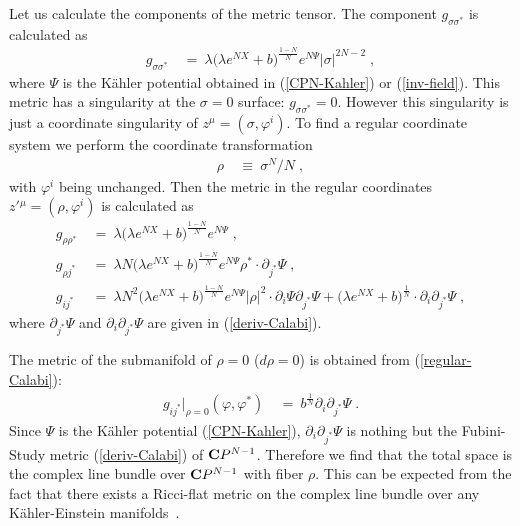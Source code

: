 \documentclass[a4paper,11pt]{article}
\newcommand{\del}{\partial}
\newcommand{\kahler}{K\"{a}hler }
\begin{document}
{Let us calculate the components of the metric tensor. 
The component $g_{\sigma \sigma^*}$ is calculated as
\begin{align}
g_{\sigma \sigma^*} 
\ &= \ 
\lambda \big( \lambda e^{N X} + b \big)^{\frac{1-N}{N}} 
e^{N \Psi} |\sigma|^{2 N - 2} \; ,
\end{align}
where $\Psi$ is the \kahler potential obtained 
in (\ref{CPN-Kahler}) or (\ref{inv-field}).
This metric has a singularity at the $\sigma = 0$ surface: $g_{\sigma
\sigma^*} = 0$.
However this singularity is just a coordinate singularity of $z^{\mu}
= (\sigma, \varphi^i)$.
To find a regular coordinate system we perform the coordinate
transformation 
\begin{align}
\rho \ &\equiv \ \sigma^N / N \; , \label{rho-Calabi}
\end{align}
with $\varphi^i$ being unchanged. 
Then the metric in the regular coordinates $z'{}^{\mu} = (\rho,
\varphi^i)$ is calculated as
\begin{align}
g_{\rho \rho^*} 
\ &= \ 
\lambda \big( \lambda e^{N X} + b \big)^{\frac{1-N}{N}} e^{N \Psi} 
\; , \nonumber \\
g_{\rho j^*} 
\ &= \ 
\lambda N \big( \lambda e^{N X} + b \big)^{\frac{1-N}{N}} 
e^{N \Psi} \rho^* \cdot \del_{j^*} \Psi \; ,
\label{regular-Calabi} \\
g_{i j^*} 
\ &= \ 
\lambda N^2 \big( \lambda e^{N X} + b \big)^{\frac{1-N}{N}} 
e^{N \Psi} |\rho|^2 \cdot \del_i \Psi \del_{j^*} \Psi 
+ \big( \lambda e^{N X} + b \big)^{\frac{1}{N}} 
\cdot \del_i \del_{j^*} \Psi \; , \nonumber 
\end{align}
where $\del_{j^*} \Psi$ and $\del_i \del_{j^*} \Psi$ are given in
(\ref{deriv-Calabi}).

The metric of the submanifold of $\rho = 0$ ($d \rho = 0$) 
is obtained from (\ref{regular-Calabi}): 
\begin{align}
g_{i j^*} \big|_{\rho = 0} (\varphi, \varphi^*) 
\ &= \
b^{\frac{1}{N}} \del_i \del_{j^*} \Psi \; . \label{sub-mfd-Calabi}
\end{align}
Since $\Psi$ is the \kahler potential (\ref{CPN-Kahler}), 
$\del_i \del_{j^*} \Psi$ is nothing but 
the Fubini-Study metric (\ref{deriv-Calabi}) 
of ${\bf C}P^{N-1}$. 
Therefore we find that 
the total space is the complex line bundle 
over ${\bf C}P^{N-1}$ with fiber $\rho$.
This can be expected from the fact that 
there exists a Ricci-flat metric on the complex line bundle over 
any K\"{a}hler-Einstein manifolds~\cite{PP}. 

}
\end{document}
